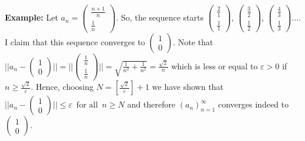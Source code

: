 \documentclass[a4paper,12pt]{article}
\theoremstyle{plain}
\begin{document}
\textbf{Example: }
  Let $a_n=\left(\begin{matrix}\frac{n+1}{n}\\ \frac{1}{n}\end{matrix}\right)$. So, the sequence starts $\left(\begin{matrix}\frac{2}{1}\\ \frac{1}{1}\end{matrix}\right),\,\left(\begin{matrix}\frac{3}{2}\\ \frac{1}{2}\end{matrix}\right),\,\left(\begin{matrix}\frac{4}{3}\\ \frac{1}{3}\end{matrix}\right)\dots$. I claim that this sequence converges to $\left(\begin{matrix} 1\\ 0\end{matrix}\right)$. Note that $||a_n-\left(\begin{matrix} 1\\ 0\end{matrix}\right)||=||\left(\begin{matrix} \frac{1}{n}\\ \frac{1}{n}\end{matrix}\right)||=\sqrt{\frac{1}{n^2}+\frac{1}{n^2}}=\frac{\sqrt{2}}{n}$ which is less or equal to $ \varepsilon>0 $ if $n\geq \frac{\sqrt{2}}{\varepsilon }$. Hence, choosing $N=\left[\frac{\sqrt{2}}{\varepsilon }\right]+1$ we have shown that $||a_n-\left(\begin{matrix} 1\\ 0\end{matrix}\right)||\leq\varepsilon \,\text{ for all }\, n\geq N$ and therefore $(a_n)_{n=1}^\infty$ converges indeed to $\left(\begin{matrix} 1\\ 0\end{matrix}\right)$.
\end{document}
